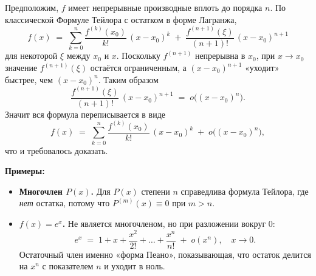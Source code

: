 \begin{customproof}
	Предположим, $f$ имеет непрерывные производные вплоть до порядка $n$. По классической Формуле Тейлора с остатком в форме Лагранжа,
	\[
		f(x)
		\;=\;
		\sum_{k=0}^{n}
		\frac{f^{(k)}(x_0)}{k!}\,(x - x_0)^k
		\;+\;
		\frac{f^{(n+1)}(\xi)}{(n+1)!}\,(x - x_0)^{n+1}
	\]
	для некоторой $\xi$ между $x_0$ и $x$.
	Поскольку $f^{(n+1)}$ непрерывна в $x_0$, при $x\to x_0$ значение $f^{(n+1)}(\xi)$ остаётся ограниченным, а $(x - x_0)^{n+1}$ «уходит» быстрее, чем $(x - x_0)^n$. Таким образом
	\[
		\frac{f^{(n+1)}(\xi)}{(n+1)!}\,(x - x_0)^{n+1}
		\;=\;
		o\bigl((x - x_0)^n\bigr).
	\]
	Значит вся формула переписывается в виде
	\[
		f(x)
		\;=\;
		\sum_{k=0}^{n}
		\frac{f^{(k)}(x_0)}{k!}\,(x - x_0)^k
		\;+\;
		o\bigl((x - x_0)^n\bigr),
	\]
	что и требовалось доказать.
\end{customproof}

\begin{customexample}
	\textbf{Примеры:}
	\begin{itemize}
		\item \textbf{Многочлен $P(x)$.}
		      Для $P(x)$ степени $n$ справедлива формула Тейлора, где \emph{нет} остатка,
		      потому что $P^{(m)}(x)\equiv0$ при $m>n$.
		\item \textbf{$f(x)=e^x$.}
		      Не является многочленом, но при разложении вокруг $0$:
		      \[
			      e^x \;=\; 1 + x + \frac{x^2}{2!} + \dots + \frac{x^n}{n!} \;+\; o(x^n),
			      \quad x\to0.
		      \]
		      Остаточный член именно «форма Пеано», показывающая, что остаток делится на $x^n$ с показателем $n$ и уходит в ноль.
	\end{itemize}
\end{customexample}
